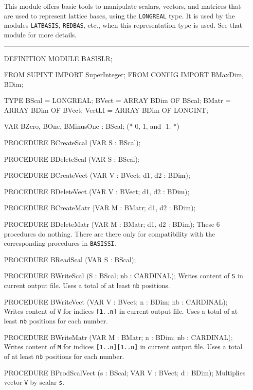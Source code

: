 
This module offers basic tools to manipulate scalars, vectors, and matrices
that are used to represent lattice bases, using the {\tt LONGREAL} type.
It is used by the modules {\tt LATBASIS}, {\tt REDBAS}, etc.,
when this representation type is used.
See that module for more details.

\bigskip\hrule
\code

DEFINITION MODULE BASISLR;

FROM SUPINT   IMPORT SuperInteger;
FROM CONFIG   IMPORT BMaxDim, BDim;

TYPE
   BScal   = LONGREAL;
   BVect   = ARRAY BDim OF BScal;
   BMatr   = ARRAY BDim OF BVect;
   VectLI  = ARRAY BDim OF LONGINT;

VAR
   BZero, BOne, BMinusOne : BScal;    (* 0, 1, and -1.                   *)

PROCEDURE BCreateScal (VAR S : BScal);

PROCEDURE BDeleteScal (VAR S : BScal);

PROCEDURE BCreateVect (VAR V : BVect; d1, d2 : BDim);

PROCEDURE BDeleteVect (VAR V : BVect; d1, d2 : BDim);

PROCEDURE BCreateMatr (VAR M : BMatr; d1, d2 : BDim);

PROCEDURE BDeleteMatr (VAR M : BMatr; d1, d2 : BDim);
\endcode
  \tab These 6 procedures do nothing.
  There are there only for compatibility with the corresponding
  procedures in {\tt BASISSI}.
  \endtab
\code

PROCEDURE BReadScal (VAR S : BScal);

PROCEDURE BWriteScal (S : BScal;   nb : CARDINAL);
\endcode
  \tab  Writes content of {\tt S} in current output file.
        Uses a total of at least {\tt nb} positions.
  \endtab
\code

PROCEDURE BWriteVect (VAR V : BVect;  n : BDim;  nb : CARDINAL);
\endcode
  \tab  Writes content of {\tt V} for indices {\tt [1..n]}
        in current output file.
        Uses a total of at least {\tt nb} positions for each number.
  \endtab
\code

PROCEDURE BWriteMatr (VAR M : BMatr;  n : BDim; nb : CARDINAL);
\endcode
  \tab  Writes content of {\tt M} for indices {\tt [1..n][1..n]}
        in current output file.
        Uses a total of at least {\tt nb} positions for each number.
  \endtab
\code

PROCEDURE BProdScalVect (s : BScal;  VAR V : BVect;  d : BDim);
\endcode
  \tab Multiplies vector {\tt V} by scalar {\tt s}. \endtab
\code

